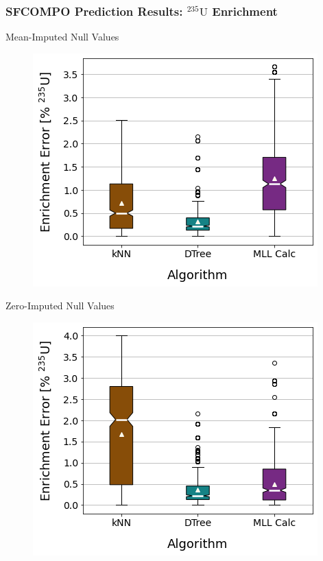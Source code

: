 \begin{frame}
  \frametitle{SFCOMPO Prediction Results: ${}^{235}\text{U}$ Enrichment}
  \begin{adjustwidth}{-15pt}{0pt}
  \begin{minipage}{0.5\textwidth}
    \begin{block}{Mean-Imputed Null Values}
      \begin{figure}
        \centering
        \includegraphics[width=\textwidth]{./figures/sfcompo_boxplots_impnull_enri.png}
      \end{figure}
    \end{block}
  \end{minipage}%
  \hfill
  \begin{minipage}{0.5\textwidth}
    \begin{block}{Zero-Imputed Null Values}
      \begin{figure}
        \centering
        \includegraphics[width=\textwidth]{./figures/sfcompo_boxplots_0null_enri.png}
      \end{figure}
    \end{block}
  \end{minipage}
  \end{adjustwidth}
\end{frame}

